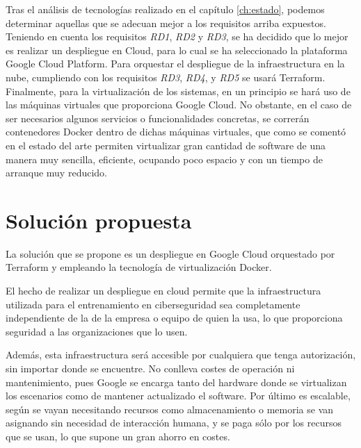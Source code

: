   Tras el análisis de tecnologías realizado en el capítulo \ref{ch:estado}, podemos determinar aquellas que se adecuan mejor a los requisitos arriba expuestos. Teniendo en cuenta los requisitos \textit{RD1}, \textit{RD2} y \textit{RD3}, se ha decidido que lo mejor es realizar un despliegue en Cloud, para lo cual se ha seleccionado la plataforma Google Cloud Platform. Para orquestar el despliegue de la infraestructura en la nube, cumpliendo con los requisitos \textit{RD3}, \textit{RD4}, y \textit{RD5} se usará Terraform. Finalmente, para la virtualización de los sistemas, en un principio se hará uso de las máquinas virtuales que proporciona Google Cloud. No obstante, en el caso de ser necesarios algunos servicios o funcionalidades concretas, se correrán contenedores Docker dentro de dichas máquinas virtuales, que como se comentó en el estado del arte permiten virtualizar gran cantidad de software de una manera muy sencilla, eficiente, ocupando poco espacio y con un tiempo de arranque muy reducido.

\section{Solución propuesta} \label{sec:sol}
  La solución que se propone es un despliegue en Google Cloud orquestado por Terraform y empleando la tecnología de virtualización Docker.

  El hecho de realizar un despliegue en cloud permite que la infraestructura utilizada para el entrenamiento en ciberseguridad sea completamente independiente de la de la empresa o equipo de quien la usa, lo que proporciona seguridad a las organizaciones que lo usen. 

  Además, esta infraestructura será accesible por cualquiera que tenga autorización, sin importar donde se encuentre. No conlleva costes de operación ni mantenimiento, pues Google se encarga tanto del hardware donde se virtualizan los escenarios como de mantener actualizado el software. Por último es escalable, según se vayan necesitando recursos como almacenamiento o memoria se van asignando sin necesidad de interacción humana, y se paga sólo por los recursos que se usan, lo que supone un gran ahorro en costes.

